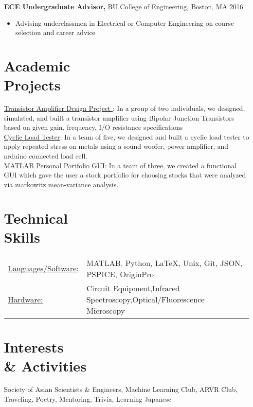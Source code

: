\documentclass[margin]{res}
\begin{document}
\begin{resume}
\begin{itemize}
		 \end{itemize}
   {\bf ECE Undergraduate Advisor,} BU College of Engineering, Boston, MA    \hfill         2016 
                \begin{itemize} \itemsep -2pt
              \item Advising underclassmen in Electrical or Computer Engineering on course selection and career advice 
                 

		 \end{itemize}
		

\section{Academic \\ Projects} 
\underline{Transistor Amplifier Design Project }: In a group of two individuals, we designed, simulated, and built a transistor amplifier using Bipolar Junction Transistors based on given gain, frequency, I/O resistance specifications  \\
\underline{Cyclic Load Tester}: In a team of five, we designed and built a cyclic load tester to apply repeated stress on metals using a sound woofer, power amplifier, and arduino connected load cell. \\
\underline{MATLAB Personal Portfolio GUI}: In a team of three, we created a functional GUI which gave the user a stock portfolio for choosing stocks that were analyzed via markowitz mean-variance analysis. 
 

\section{Technical \\ Skills}
   \begin{tabular}{l p{4.5in}}
    \underline{Languages/Software:} & MATLAB, Python, LaTeX, Unix, Git, JSON, PSPICE, OriginPro \\
     \underline{Hardware:} & Circuit Equipment,Infrared Spectroscopy,Optical/Fluorescence Microscopy \\
 \end{tabular}
 
\section{Interests \\ \& Activities}
Society of Asian Scientists \& Engineers, Machine Learning Club, ARVR Club, Traveling, Poetry, Mentoring, Trivia, Learning Japanese 
\end{resume} 
\end{document}
